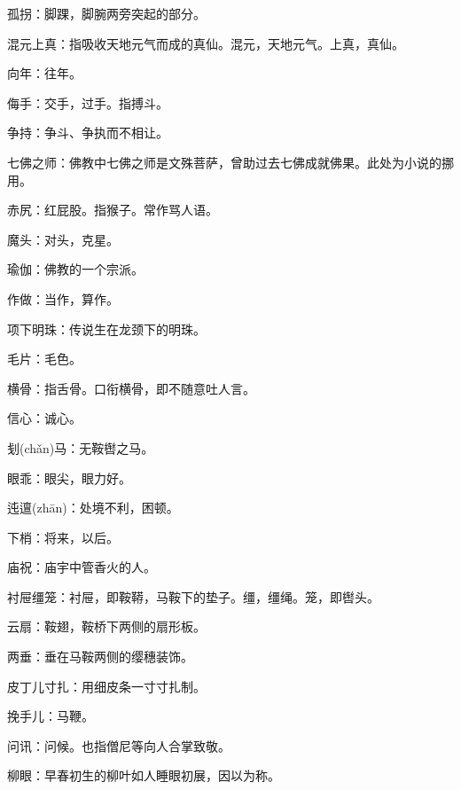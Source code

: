 \startbuffer[616]
孤拐：脚踝，脚腕两旁突起的部分。
\stopbuffer


\startbuffer[617]
混元上真：指吸收天地元气而成的真仙。混元，天地元气。上真，真仙。
\stopbuffer


\startbuffer[618]
向年：往年。
\stopbuffer


\startbuffer[619]
侮手：交手，过手。指搏斗。
\stopbuffer


\startbuffer[620]
争持：争斗、争执而不相让。
\stopbuffer


\startbuffer[621]
七佛之师：佛教中七佛之师是文殊菩萨，曾助过去七佛成就佛果。此处为小说的挪用。
\stopbuffer


\startbuffer[622]
赤尻：红屁股。指猴子。常作骂人语。
\stopbuffer


\startbuffer[623]
魔头：对头，克星。
\stopbuffer


\startbuffer[624]
瑜伽：佛教的一个宗派。
\stopbuffer


\startbuffer[625]
作做：当作，算作。
\stopbuffer


\startbuffer[626]
项下明珠：传说生在龙颈下的明珠。
\stopbuffer


\startbuffer[627]
毛片：毛色。
\stopbuffer


\startbuffer[628]
横骨：指舌骨。口衔横骨，即不随意吐人言。
\stopbuffer


\startbuffer[629]
信心：诚心。
\stopbuffer


\startbuffer[630]
刬(chǎn)马：无鞍辔之马。
\stopbuffer


\startbuffer[631]
眼乖：眼尖，眼力好。
\stopbuffer


\startbuffer[632]
迍邅(zhān)：处境不利，困顿。
\stopbuffer


\startbuffer[633]
下梢：将来，以后。
\stopbuffer


\startbuffer[634]
庙祝：庙宇中管香火的人。
\stopbuffer


\startbuffer[635]
衬屉缰笼：衬屉，即鞍鞯，马鞍下的垫子。缰，缰绳。笼，即辔头。
\stopbuffer


\startbuffer[636]
云扇：鞍翅，鞍桥下两侧的扇形板。
\stopbuffer


\startbuffer[637]
两垂：垂在马鞍两侧的缨穗装饰。
\stopbuffer


\startbuffer[638]
皮丁儿寸扎：用细皮条一寸寸扎制。
\stopbuffer


\startbuffer[639]
挽手儿：马鞭。
\stopbuffer


\startbuffer[640]
问讯：问候。也指僧尼等向人合掌致敬。
\stopbuffer


\startbuffer[641]
柳眼：早春初生的柳叶如人睡眼初展，因以为称。
\stopbuffer


